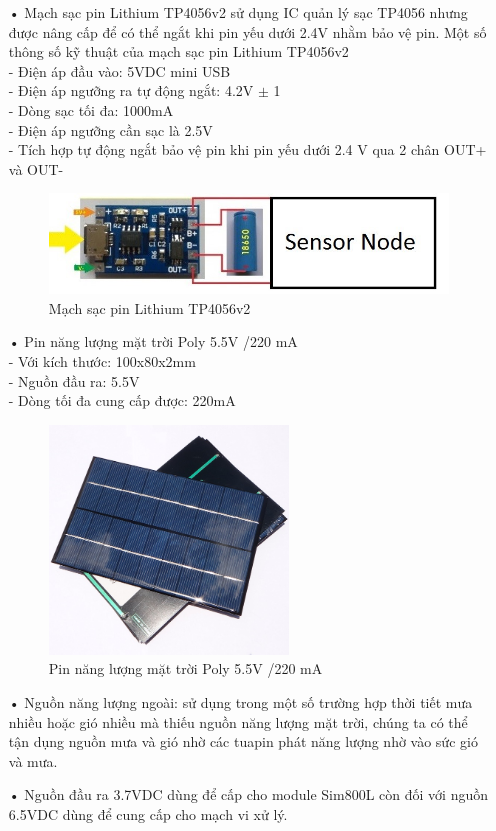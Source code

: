 \begin{itemize}
	\item[•]Mạch sạc pin Lithium TP4056v2 sử dụng IC quản lý sạc TP4056 nhưng được nâng cấp để có thể ngắt khi pin yếu dưới 2.4V nhằm bảo vệ pin. Một số thông số kỹ thuật của mạch sạc pin Lithium TP4056v2\\
	-	Điện áp đầu vào: 5VDC mini USB\\
	-	Điện áp ngưỡng ra tự động ngắt: 4.2V $\pm$ 1\\
	-	Dòng sạc tối đa: 1000mA\\
	-	Điện áp ngưỡng cần sạc là 2.5V\\
	-	Tích hợp tự động ngắt bảo vệ pin khi pin yếu dưới 2.4 V qua 2 chân OUT+ và OUT-
	\begin{figure}[H]
		\centering    
		\includegraphics[width=5in]{tp4056}
		\caption[Mạch sạc pin Lithium TP4056v2]{Mạch sạc pin Lithium TP4056v2}
		\label{fig:tp4056}
	\end{figure}
	\item[•]Pin năng lượng mặt trời Poly 5.5V /220 mA\\
	-	Với kích thước: 100x80x2mm\\
	-	Nguồn đầu ra: 5.5V\\
	-	Dòng tối đa cung cấp được: 220mA\\
	\begin{figure}[H]
		\centering    
		\includegraphics[width=0.6\textwidth]{solarpanel_real}
		\caption[Pin năng lượng mặt trời Poly 5.5V /220 mA]{Pin năng lượng mặt trời Poly 5.5V /220 mA}
		\label{fig:solarpanel_real}
	\end{figure}
	
	\item[•]Nguồn năng lượng ngoài: sử dụng trong một số trường hợp thời tiết mưa nhiều hoặc gió nhiều mà thiếu nguồn năng lượng mặt trời, chúng ta có thể tận dụng nguồn mưa và gió nhờ các tuapin phát năng lượng nhờ vào sức gió và mưa.
	\item[•] Nguồn đầu ra 3.7VDC dùng để cấp cho module Sim800L còn đối với nguồn 6.5VDC dùng để cung cấp cho mạch vi xử lý.
\end{itemize}	

